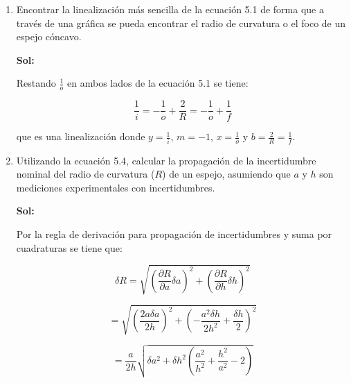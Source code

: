 \documentclass[12pt,a4paper]{article}
\begin{document}
\begin{enumerate}




\item Encontrar la linealización más sencilla de la ecuación 5.1 de forma que a través de una gráfica se pueda encontrar el radio de curvatura o el foco de un espejo cóncavo.

\textbf{Sol:}

Restando $\frac{1}{o}$ en ambos lados de la ecuación 5.1 se tiene:

\begin{equation*}
    \frac{1}{i} = -\frac{1}{o} + \frac{2}{R} = -\frac{1}{o} + \frac{1}{f}
\end{equation*}

que es una linealización donde $y = \frac{1}{i}$, $m=-1$, $x= \frac{1}{o}$ y  $b = \frac{2}{R} = \frac{1}{f}$.





\item Utilizando la ecuación 5.4, calcular la propagación de la incertidumbre nominal del radio de curvatura ($R$) de un espejo, asumiendo que $a$ y $h$ son mediciones experimentales con incertidumbres.

\textbf{Sol:}

Por la regla de derivación para propagación de incertidumbres y suma por cuadraturas se tiene que:

\begin{equation*}
    \delta R = \sqrt{\left(\frac{\partial R}{\partial a}\delta a\right)^2 + \left(\frac{\partial R}{\partial h}\delta h\right)^2}
\end{equation*}

\begin{equation*}
    = \sqrt{\left(\frac{2a\delta a}{2h}\right)^2 + \left(-\frac{a^2\delta h}{2h^2} + \frac{\delta h}{2}\right)^2}
\end{equation*}

\begin{equation*}
    = \frac{a}{2h} \sqrt{\delta a^2 + \delta h^2 \left(\frac{a^2}{h^2} + \frac{h^2}{a^2} -2\right)}
\end{equation*}

    
    
\end{enumerate}
\end{document}
